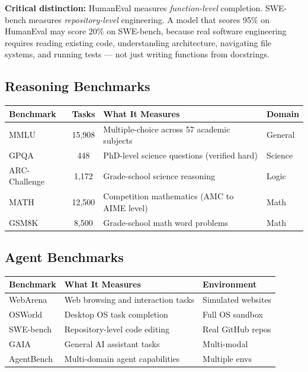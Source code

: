 \textbf{Critical distinction:} HumanEval measures \textit{function-level} completion. SWE-bench measures \textit{repository-level} engineering. A model that scores 95\% on HumanEval may score 20\% on SWE-bench, because real software engineering requires reading existing code, understanding architecture, navigating file systems, and running tests --- not just writing functions from docstrings.

\subsection{Reasoning Benchmarks}

\begin{center}
\begin{tabular}{|l|c|p{5cm}|l|}
\hline
\textbf{Benchmark} & \textbf{Tasks} & \textbf{What It Measures} & \textbf{Domain} \\
\hline
MMLU & 15,908 & Multiple-choice across 57 academic subjects & General \\
GPQA & 448 & PhD-level science questions (verified hard) & Science \\
ARC-Challenge & 1,172 & Grade-school science reasoning & Logic \\
MATH & 12,500 & Competition mathematics (AMC to AIME level) & Math \\
GSM8K & 8,500 & Grade-school math word problems & Math \\
\hline
\end{tabular}
\end{center}

\subsection{Agent Benchmarks}

\begin{center}
\begin{tabular}{|l|p{4.5cm}|l|}
\hline
\textbf{Benchmark} & \textbf{What It Measures} & \textbf{Environment} \\
\hline
WebArena & Web browsing and interaction tasks & Simulated websites \\
OSWorld & Desktop OS task completion & Full OS sandbox \\
SWE-bench & Repository-level code editing & Real GitHub repos \\
GAIA & General AI assistant tasks & Multi-modal \\
AgentBench & Multi-domain agent capabilities & Multiple envs \\
\hline
\end{tabular}
\end{center}

